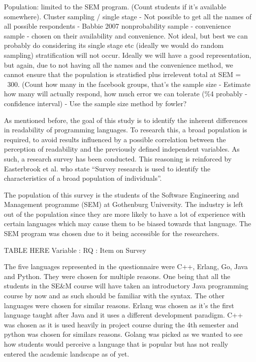 \documentclass[times, 10pt,twocolumn]{IEEEtran}
\begin{document}
  Population: limited to the SEM program. (Count students if it's available somewhere).
  Cluster sampling / single stage - Not possible to get all the names of all possible respondents - Babbie 2007
  nonprobability sample - convenience sample - chosen on their availability and convenience. Not ideal, but best we can probably do considering its single stage etc (ideally we would do random sampling)
  stratification will not occur. Ideally we will have a good representation, but again, due to not having all the names and the convenience method, we cannot ensure that the population is stratisfied plus irrelevent
  total at SEM = ~300. (Count how many in the facebook groups, that's the sample size - Estimate how many will actually respond, how much error we can tolerate (\%4 probably - confidence interval) - Use the sample size method by fowler?


As mentioned before, the goal of this study is to identify the inherent differences in readability of programming languages. To research this, a broad population is required, to avoid results influenced by a possible correlation between the perception of readability and the previously defined independent variables. As such, a research survey has been conducted. This reasoning is reinforced by Easterbrook et al. \cite{easterbrook2008selecting} who state ``Survey research is used to identify the characteristics of a broad population of individuals''. 
\newline

The population of this survey is the students of the Software Engineering and Management programme (SEM) at Gothenburg University. The industry is left out of the population since they are more likely to have a lot of experience with certain languages which may cause them to be biased towards that language. The SEM program was chosen due to it being accessible for the researchers. 
\newline

TABLE HERE
Variable : RQ : Item on Survey


The five languages represented in the questionnaire were C++, Erlang, Go, Java and Python. They were chosen for multiple reasons. One being that all the students in the SE\&M course will have taken an introductory Java programming course by now and as such should be familiar with the syntax. The other languages were chosen for similar reasons. Erlang was chosen as it's the first language taught after Java and it uses a different development paradigm. C++ was chosen as it is used heavily in project course during the 4th semester and python was chosen for similars reasons. Golang was picked as we wanted to see how students would perceive a language that is popular but has not really entered the academic landscape as of yet.
\end{document}
